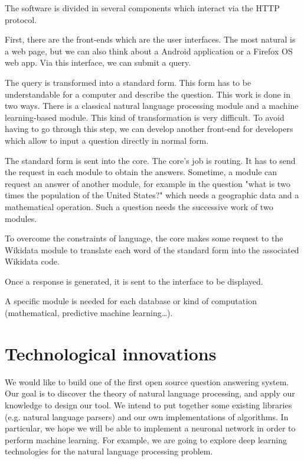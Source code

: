 \documentclass[a4paper,10pt]{article}
\begin{document}
The software is divided in several components which interact via the HTTP protocol.

First, there are the front-ends which are the user interfaces. The most natural is
a web page, but we can also think about a Android application
or a Firefox OS web app. Via this interface, we can submit a query.

The query is transformed into a standard form. This form has to be understandable 
for a computer and describe the question. This work is done in two ways. There is 
a classical natural language processing module and a machine learning-based module. 
This kind of transformation is very difficult. To avoid having to go through this 
step, we can develop another front-end for developers which allow to input a question
 directly in normal form.

The standard form is sent into the core. The core's job is routing. It has to send 
the request in each module to obtain the answers. Sometime, a module can request 
an answer of another module, for example in the question "what is two times the 
population of the United States?" which needs a geographic data and a mathematical
 operation. Such a question needs the successive work of two modules.

To overcome the constraints of language, the core makes some request to the Wikidata
 module to translate each word of the standard form into the associated Wikidata 
 code.

Once a response is generated, it is sent to the interface to be displayed.

A specific module is needed for each database or kind of computation (mathematical, 
predictive machine learning\ldots).

\section{Technological innovations}

We would like to build one of the first open source question answering system. 
Our goal is to discover the theory of natural language processing, and apply our 
knowledge to design our tool. We intend to put together some existing libraries 
(e.g. natural language parsers) and our own implementations of algorithms. In 
particular, we hope we will be able to implement a neuronal network in order to 
perform machine learning. For example, we are going to explore deep learning
technologies for the natural language processing problem.
\end{document}
